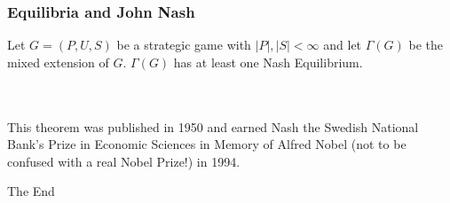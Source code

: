 \documentclass{beamer}
\begin{document}
\begin{frame}
  
\frametitle{Equilibria and John Nash}

\begin{theorem}
  Let $G = (P,U,S)$ be a strategic game with $|P|,|S| < \infty$ and
  let $\Gamma(G)$ be the mixed extension of $G$. $\Gamma(G)$ has at
  least one Nash Equilibrium. 
  \end{theorem}\\~\\

This theorem was published in 1950 and earned Nash the
  Swedish National Bank's Prize in Economic Sciences in Memory of
  Alfred Nobel (not to be confused with a real Nobel Prize!) in 1994.
  
\end{frame}


\begin{frame}
  
  \begin{center}
    \Huge The End
  \end{center}
  
\end{frame}
\end{document}
